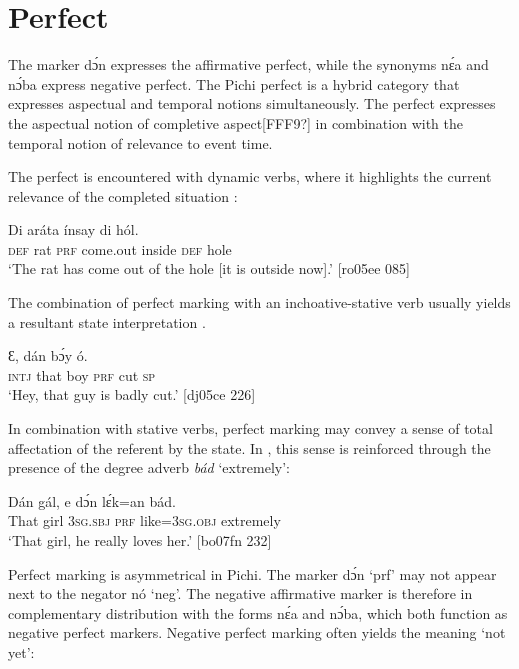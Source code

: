 \section{Perfect}\label{sec:6.6}

The marker dɔ́n expresses the affirmative perfect, while the synonyms nɛ́a and nɔ́ba express negative perfect. The Pichi perfect is a hybrid category that expresses aspectual and temporal notions simultaneously. The perfect expresses the aspectual notion of completive aspect[FFF9?] in combination with the temporal notion of relevance to event time. 


The perfect is encountered with dynamic verbs, where it highlights the current relevance of the completed situation :



\ea%
    \label{ex:key:392}
    \gll Di  aráta        ínsay  di  hól.\\
\textsc{def}  rat    \textsc{prf}  come.out  inside  \textsc{def}  hole\\

\glt ‘The rat has come out of the hole [it is outside now].’ [ro05ee 085]
\z

The combination of perfect marking with an inchoative-stative verb usually yields a resultant state interpretation . 


\ea%
    \label{ex:key:393}
    \gll Ɛ,  dán    bɔ́y        ó.\\
\textsc{intj}  that    boy    \textsc{prf}  cut  \textsc{sp}\\

\glt ‘Hey, that guy is badly cut.’ [dj05ce 226]
\z

In combination with stative verbs, perfect marking may convey a sense of total affectation of the referent by the state. In , this sense is reinforced through the presence of the degree adverb \textit{bád} ‘extremely’:


\ea%
    \label{ex:key:394}
    \gll Dán    gál,  e    dɔ́n    lɛ́k=an    bád.\\
That  girl  \textsc{3sg.sbj}  \textsc{prf}    like=\textsc{3sg.obj}  extremely\\

\glt ‘That girl, he really loves her.’ [bo07fn 232]
\z

Perfect marking is asymmetrical in Pichi. The marker dɔ́n ‘prf’ may not appear next to the negator nó ‘neg’. The negative affirmative marker is therefore in complementary distribution with the forms nɛ́a and nɔ́ba, which both function as negative perfect markers. Negative perfect marking often yields the meaning ‘not yet’: 


